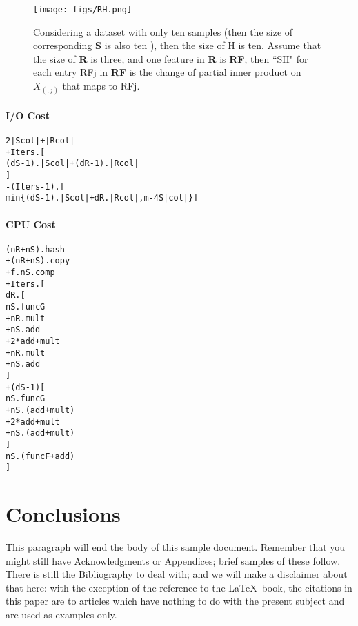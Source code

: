 \documentclass{vldb}
\begin{document}
\begin{figure}[t]
\centering
\texttt{[image: figs/RH.png]}
\caption{Considering a dataset with only ten samples (then the size of corresponding \textbf{S} is also ten ), then the size of H is ten. Assume that the size of \textbf{R} is three, and one feature  in \textbf{R} is \textbf{RF},
then ``SH" for each entry RFj in \textbf{RF} is the change of partial inner product on $X_{(,j)}$ that maps to RFj. 
}
\label{fig:RH}
\end{figure}

\vspace{-2mm}
\paragraph*{I/O Cost}
\vspace{-2mm}
\begin{alltt}
2|Scol| + |Rcol|      
+ Iters.[
	(dS-1).|Scol| + (dR-1).|Rcol| 
    ]
- (Iters-1).[                  
 min\{(dS-1).|Scol|+dR.|Rcol|, m - 4S|col|\}]   
\end{alltt}

\vspace{-2mm}
\paragraph*{CPU Cost}
\vspace{-3mm}
\begin{alltt}
  (nR+nS).hash             
+(nR+nS).copy
+ f.nS.comp
+ Iters.[
   	dR.[                    
	    nS.funcG           
	 + nR.mult      
	 + nS.add    
	 + 2*add+mult              
	 + nR.mult                 
	 + nS.add                  
	]
    + (dS-1)[           
            nS.funcG      
         + nS.(add+mult)
         + 2*add+mult      
         + nS.(add+mult)   
        ]  
        nS.(funcF+add)     	
   ]

\end{alltt}



\section{Conclusions}
This paragraph will end the body of this sample document.
Remember that you might still have Acknowledgments or
Appendices; brief samples of these
follow.  There is still the Bibliography to deal with; and
we will make a disclaimer about that here: with the exception
of the reference to the \LaTeX\ book, the citations in
this paper are to articles which have nothing to
do with the present subject and are used as
examples only.
\end{document}
